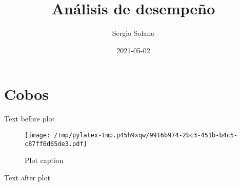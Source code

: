 \documentclass{article}%
\title{Análisis de desempeño}%
\author{Sergio Solano}%
\date{2021{-}05{-}02}%
\begin{document}
%
\normalsize%
\maketitle%
\section{Cobos}%
\label{sec:Cobos}%
Text before plot%


\begin{figure}[htbp]%
\centering%
\texttt{[image: /tmp/pylatex-tmp.p45h9xqw/9916b974-2bc3-451b-b4c5-c87ff6d65de3.pdf]}%
\caption{Plot caption}%
\end{figure}

%
Text after plot

%
\end{document}
